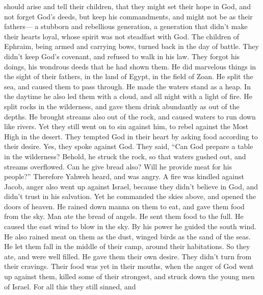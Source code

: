 should arise and tell their children,  that they might set
their hope in God, and not forget God's deeds, but keep his
commandments,  and might not be as their fathers--- a
stubborn and rebellious generation, a generation that didn't make their
hearts loyal, whose spirit was not steadfast with God. 
The children of Ephraim, being armed and carrying bows, turned back in
the day of battle.  They didn't keep God's covenant, and
refused to walk in his law.  They forgot his doings, his
wondrous deeds that he had shown them.  He did marvelous
things in the sight of their fathers, in the land of Egypt, in the field
of Zoan.  He split the sea, and caused them to pass
through. He made the waters stand as a heap.  In the
daytime he also led them with a cloud, and all night with a light of
fire.  He split rocks in the wilderness, and gave them
drink abundantly as out of the depths.  He brought
streams also out of the rock, and caused waters to run down like rivers.
 Yet they still went on to sin against him, to rebel
against the Most High in the desert.  They tempted God in
their heart by asking food according to their desire. 
Yes, they spoke against God. They said, ``Can God prepare a table in the
wilderness?  Behold, he struck the rock, so that waters
gushed out, and streams overflowed. Can he give bread also? Will he
provide meat for his people?''  Therefore Yahweh heard,
and was angry. A fire was kindled against Jacob, anger also went up
against Israel,  because they didn't believe in God, and
didn't trust in his salvation.  Yet he commanded the
skies above, and opened the doors of heaven.  He rained
down manna on them to eat, and gave them food from the sky.
 Man ate the bread of angels. He sent them food to the
full.  He caused the east wind to blow in the sky. By his
power he guided the south wind.  He also rained meat on
them as the dust, winged birds as the sand of the seas. 
He let them fall in the middle of their camp, around their habitations.
 So they ate, and were well filled. He gave them their
own desire.  They didn't turn from their cravings. Their
food was yet in their mouths,  when the anger of God went
up against them, killed some of their strongest, and struck down the
young men of Israel.  For all this they still sinned, and
